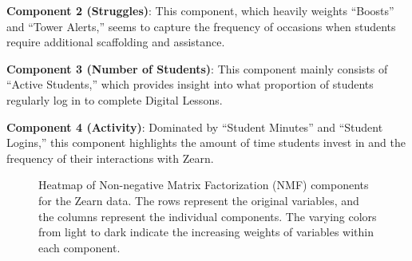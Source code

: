 \documentclass[
  number,
  preprint,
  3p,
  onecolumn]{elsarticle}
\begin{document}
\textbf{Component 2 (Struggles)}: This component, which heavily weights
``Boosts'' and ``Tower Alerts,'' seems to capture the frequency of
occasions when students require additional scaffolding and assistance.

\textbf{Component 3 (Number of Students)}: This component mainly
consists of ``Active Students,'' which provides insight into what
proportion of students regularly log in to complete Digital Lessons.

\textbf{Component 4 (Activity)}: Dominated by ``Student Minutes'' and
``Student Logins,'' this component highlights the amount of time
students invest in and the frequency of their interactions with Zearn.

\begin{figure}

\begin{minipage}{\linewidth}



\end{minipage}%
\newline
\begin{minipage}{\linewidth}



\end{minipage}%

\caption{\label{fig-nmf-heatmap}Heatmap of Non-negative Matrix
Factorization (NMF) components for the Zearn data. The rows represent
the original variables, and the columns represent the individual
components. The varying colors from light to dark indicate the
increasing weights of variables within each component.}

\end{figure}%
\end{document}
